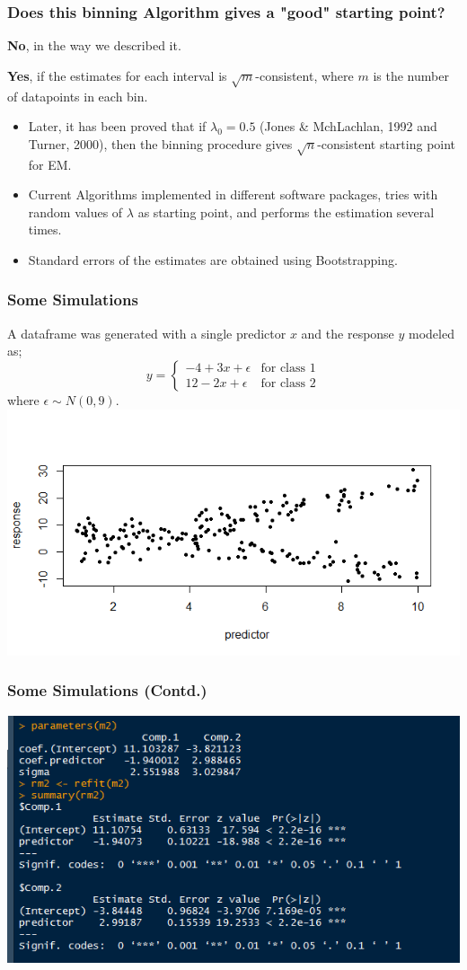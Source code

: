 \documentclass{beamer}
\begin{document}
\begin{frame}
	\frametitle{Does this binning Algorithm gives a "good" starting point?}
	\textbf{No}, in the way we described it.\par 
	\textbf{Yes}, if the estimates for each interval is $\sqrt{m}$-consistent, where $m$ is the number of datapoints in each bin.\\
	\begin{itemize}
		\item Later, it has been proved that if $\lambda_0 = 0.5$ (Jones \& MchLachlan, 1992 and Turner, 2000), then the binning procedure gives $\sqrt{n}$-consistent starting point for EM.
		\item Current Algorithms implemented in different software packages, tries with random values of $\lambda$ as starting point, and performs the estimation several times.
		\item Standard errors of the estimates are obtained using Bootstrapping.
	\end{itemize}
\end{frame}

\begin{frame}
	\frametitle{Some Simulations}
	A dataframe was generated with a single predictor $x$ and the response $y$ modeled as;
	$$y = \begin{cases}
		-4 + 3x + \epsilon & \text{for class 1}\\
		12 - 2x + \epsilon & \text{for class 2}
	\end{cases}$$
	where $\epsilon \sim N(0,9)$.
	\includegraphics[width=\linewidth]{./simplot_1.png}
\end{frame}

\begin{frame}
	\frametitle{Some Simulations (Contd.)}
	\includegraphics[width = \linewidth]{./sim_results.png}
\end{frame}
\end{document}

